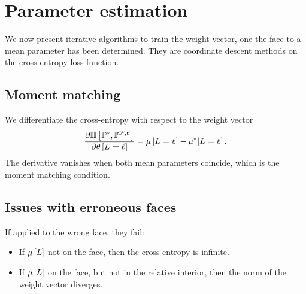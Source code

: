 \section{Parameter estimation}

We now present iterative algorithms to train the weight vector, one the face to a mean parameter has been determined.
They are coordinate descent methods on the cross-entropy loss function.

\subsection{Moment matching}


We differentiate the cross-entropy with respect to the weight vector
\begin{align*}
    \frac{\partial \mathbb{H}\left[\mathbb{P}^*,\mathbb{P}^{\mathcal{F},\theta}\right]}{\partial \theta\left[L_{}=\ell_{}\right]}
    = \mu\left[L_{}=\ell_{}\right]-\mu^*[L_{}=\ell_{}] \, .
\end{align*}
The derivative vanishes when both mean parameters coincide, which is the moment matching condition.

\subsection{Issues with erroneous faces}

If applied to the wrong face, they fail:
\begin{itemize}
    \item If $\mu\left[L\right]$ not on the face, then the cross-entropy is infinite.
    \item If $\mu\left[L\right]$ on the face, but not in the relative interior, then the norm of the weight vector diverges.
\end{itemize}
